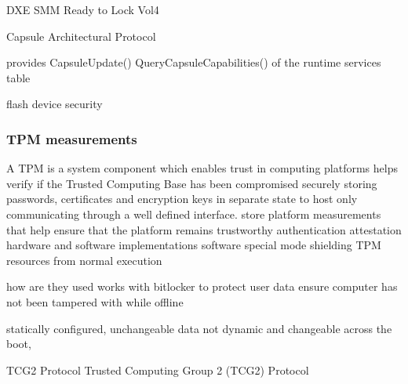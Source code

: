 
DXE SMM Ready to Lock Vol4

Capsule Architectural Protocol

provides
CapsuleUpdate()
QueryCapsuleCapabilities()
of the runtime services table

flash device security

\subsubsection{TPM measurements}
A \acf{TPM} is a system component which enables trust in computing platforms
helps verify if the Trusted Computing Base has been compromised
securely storing passwords, certificates and encryption keys in separate state to host
only communicating through a well defined interface.
store platform measurements that help ensure that the platform remains trustworthy
authentication
attestation
hardware and software implementations
software special mode shielding TPM resources from normal execution
\cite{tcg-tpm-summary}
\cite{tcg-tpm-library-part1-architecture}

how are they used
works with bitlocker to protect user data
ensure computer has not been tampered with while offline

statically configured, unchangeable data
not dynamic and changeable across the boot,
\cite{tianocore-trusted-boot-chain}

\cite{tianocore-trusted-boot-chain}

\ac{TCG}2 Protocol
Trusted Computing Group 2 (TCG2) Protocol \cite[6.7.3]{tcg-efi-protocol-spec}

